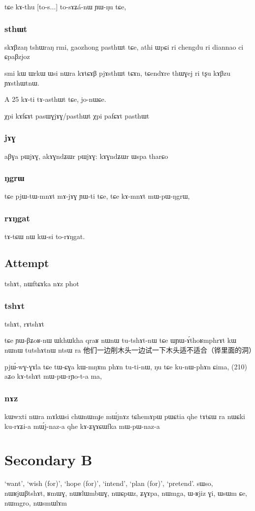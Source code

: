 \documentclass[oldfontcommands,oneside,a4paper,11pt]{article}
\begin{document}
tɕe kɤ-thu [to-s...] to-sɤʑá-nɯ ɲɯ-ŋu tɕe,
\subsubsection{sthɯt}
skɤβzaŋ tshɯraŋ rmi, gaozhong pasthɯt tɕe, athi ɯpɕi ri 
chengdu ri diannao ci ɕpaβzjoz

smi kɯ ɯrkɯ ɯsi nɯra kɤtɕɤβ pjɤsthɯt tɕɤn,
tɕendɤre thɯɣej ri tʂu kɤβzu ɲɤsthɯtnɯ.

A	25	kɤ-ti	tɤ-asthɯt	tɕe,	jo-nɯɕe.		
 
χpi kɤfɕɤt pasɯɣjɤɣ/pasthɯt
χpi pafɕɤt pasthɯt
\subsubsection{jɤɣ}
aβɣa pɯjɤɣ, akɤɣndʑɯr pɯjɤɣ: kɤɣndʑɯr ɯspa tharɕo

\subsubsection{ŋgrɯ}

tɕe pjɯ-tɯ-mnɤt mɤ-jɤɣ ɲɯ-ti tɕe, 
tɕe kɤ-mnɤt mɯ-pɯ-ŋgrɯ,
\subsubsection{rɤŋgat}
tɤ-tɕɯ nɯ kɯ-si to-rɤŋgat.

\subsection{Attempt}
tshɤt,  nɯftɕɤka
nɤz
phot

\subsubsection{tshɤt}
tshɤt, rɤtshɤt

tɕe ɲɯ-βʑoʁ-nɯ ɯkhɯkha qraʁ nɯnɯ tu-tshɤt-nɯ tɕe
ɯɲɯ-ɤ́thoʁmphrɤt kɯ nɯnɯ tutshɤtnɯ ntsɯ ra
他们一边削木头一边试一下木头适不适合（铧里面的洞）

pjɯ́-wɣ-ɣɤla tɕe tɯ-ɕɣa kɯ-mŋɤm phɤn tu-ti-nɯ,
ŋu tɕe ku-nɯ-phɤn ɕima,  (210)
aʑo kɤ-tshɤt mɯ-pɯ-rɲo-t-a ma,
\subsubsection{nɤz}
kɯwxti nɯra mɤkɯsi chɯnɯmɟe mɯ́jnɤz
tɕhemɤpɯ pɯɕtia qhe tɤtɕɯ ra nɯɕki ku-rɤʑi-a mɯ́j-naz-a qhe
kɤ-ʑɣɤɕɯfka mɯ-pɯ-naz-a

 
  \section{Secondary B} 
 ‘want’, ‘wish (for)’, ‘hope (for)’, ‘intend’, ‘plan (for)’, ‘pretend’.
sɯso, nɯʁjɯβtshɤt, ʁmɯɣ, nɯʁlɯmbɯɣ, nɯɕpɯz, ʑɣɤpa, nɯmga, ɯ-ʁjiz ɣi, ɯsɯm ɕe, nɯmgro, nɯsmɯlɤm
\end{document}
